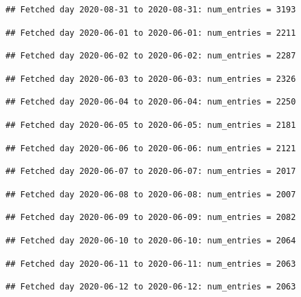 \documentclass[]{article}
\begin{document}
\begin{verbatim}
## Fetched day 2020-08-31 to 2020-08-31: num_entries = 3193
\end{verbatim}

\begin{verbatim}
## Fetched day 2020-06-01 to 2020-06-01: num_entries = 2211
\end{verbatim}

\begin{verbatim}
## Fetched day 2020-06-02 to 2020-06-02: num_entries = 2287
\end{verbatim}

\begin{verbatim}
## Fetched day 2020-06-03 to 2020-06-03: num_entries = 2326
\end{verbatim}

\begin{verbatim}
## Fetched day 2020-06-04 to 2020-06-04: num_entries = 2250
\end{verbatim}

\begin{verbatim}
## Fetched day 2020-06-05 to 2020-06-05: num_entries = 2181
\end{verbatim}

\begin{verbatim}
## Fetched day 2020-06-06 to 2020-06-06: num_entries = 2121
\end{verbatim}

\begin{verbatim}
## Fetched day 2020-06-07 to 2020-06-07: num_entries = 2017
\end{verbatim}

\begin{verbatim}
## Fetched day 2020-06-08 to 2020-06-08: num_entries = 2007
\end{verbatim}

\begin{verbatim}
## Fetched day 2020-06-09 to 2020-06-09: num_entries = 2082
\end{verbatim}

\begin{verbatim}
## Fetched day 2020-06-10 to 2020-06-10: num_entries = 2064
\end{verbatim}

\begin{verbatim}
## Fetched day 2020-06-11 to 2020-06-11: num_entries = 2063
\end{verbatim}

\begin{verbatim}
## Fetched day 2020-06-12 to 2020-06-12: num_entries = 2063
\end{verbatim}
\end{document}
